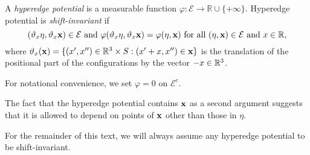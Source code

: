 \begin{definition}\label{def:potential}
A \textit{hyperedge potential} is a measurable function $\varphi:\mathcal E\to \mathbb R \cup \{+\infty\}$. \newline
Hyperedge potential is  \textit{shift-invariant} if 
	$$(\vartheta_x \eta, \vartheta_x {\mathbf{x}}) \in \mathcal E \text{ and } \varphi(\vartheta_x \eta, \vartheta_x {\mathbf{x}}) = \varphi(\eta,{\mathbf{x}}) \text { for all } (\eta,{\mathbf{x}})\in\mathcal E \text{ and }x \in \mathbb{R},$$
where $\vartheta_x({\mathbf{x}}) = \{(x',x'')\in{\mathbb R^3}\times S: (x'+x,x'')\in{\mathbf{x}}\}$ is the translation of the positional part of the configurations by the vector $-x \in {\mathbb R^3}$.	

For notational convenience, we set $\varphi = 0$ on $\mathcal E^c$.
\end{definition}

The fact that the hyperedge potential contains ${\mathbf{x}}$ as a second argument suggests that it is allowed to depend on points of ${\mathbf{x}}$ other than those in $\eta$.

\noindent For the remainder of this text, we will always assume any hyperedge potential to be shift-invariant.

